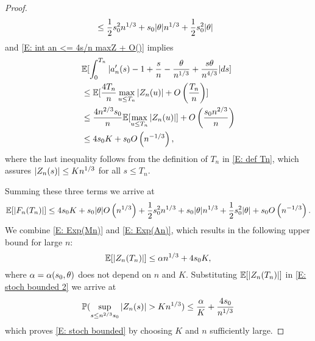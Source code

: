 \begin{proof}
\begin{equation}
\begin{aligned}
	&\leq \frac{1}{2}s_0^2n^{1 / 3} + s_0|\theta|n^{1 / 3} + \frac{1}{2}s_0^2|\theta|
	\end{aligned}
	\end{equation}
	and \eqref{E: int an <= 4s/n maxZ + O()} implies
	\begin{equation}
	\begin{aligned}
	&\mathbb{E}[\int_{0}^{T_n} |a'_n(s) - 1 + \frac{s}{n} - \frac{\theta}{n^{1 / 3}} + \frac{s\theta}{n^{4 / 3}}|ds] \\
	&\leq \mathbb{E}[ \frac{4T_n}{n} \max_{u \leq T_n}|Z_n(u)| + O\left(\frac{T_n}{n}\right) ] \\
	&\leq \frac{4n^{2 / 3}s_0}{n} \mathbb{E}[\max_{u \leq T_n}|Z_n(u)|] + O\left(\frac{s_0n^{2 / 3}}{n}\right) \\
	&\leq 4s_0 K + s_0O\left(n^{-1 / 3}\right),
	\end{aligned}
	\end{equation}
	where the last inequality follows from the definition of $T_n$ in \eqref{E: def Tn},
	which assures $|Z_n(s)| \leq Kn^{1 / 3}$ for all $s \leq T_n$. 
	
	Summing these three terms we arrive at
	\begin{equation} \label{E: Exp(An)}
	\mathbb{E}[|F_n(T_n)|] \leq 4 s_0 K + s_0|\theta|O\left(n^{1 / 3}\right) + \frac{1}{2}s_0^2n^{1 / 3} + s_0|\theta|n^{1 / 3} + \frac{1}{2}s_0^2|\theta| + s_0O\left(n^{-1 / 3}\right).
	\end{equation}
	We combine \eqref{E: Exp(Mn)} and \eqref{E: Exp(An)}, 
	which results in the following upper bound for large $n$:
	\begin{equation} \label{E: bound Zn}
	\mathbb{E}[|Z_n(T_n)|] \leq \alpha n^{1 / 3} + 4s_0K,
	\end{equation}
	where $\alpha = \alpha(s_0,\theta)$ does not depend on $n$ and $K$. 
	Substituting $\mathbb{E}[|Z_n(T_n)|]$ in \eqref{E: stoch bounded 2} we arrive at
	\begin{equation}
	\mathbb{P}( \sup_{s\leq n^{2/3} s_0} |Z_n(s)| > K n^{1 / 3} ) \leq \frac{\alpha}{K} + \frac{4s_0}{n^{1 / 3}}
	\end{equation}
	which proves \eqref{E: stoch bounded} by choosing $K$ and $n$ sufficiently large.
\end{proof}


